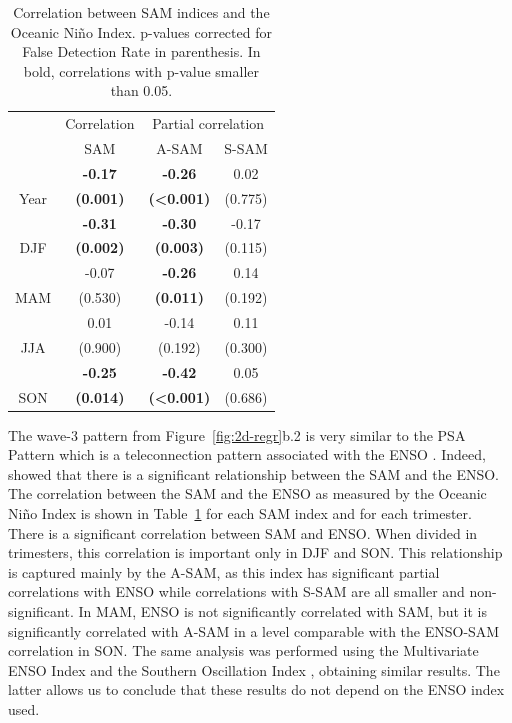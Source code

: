 \documentclass[smallextended]{svjour3}       %
\begin{document}
\begin{table}

\caption{\label{tab:enso-cor-table}Correlation between SAM indices and the Oceanic Niño Index. p-values corrected for False Detection Rate in parenthesis. In bold, correlations with p-value smaller than 0.05.}
\centering
\begin{tabular}[t]{c>{}c>{}c>{}c}
\toprule
\multicolumn{1}{c}{ } & \multicolumn{1}{c}{Correlation} & \multicolumn{2}{c}{Partial correlation} \\
\cmidrule(l{3pt}r{3pt}){2-2} \cmidrule(l{3pt}r{3pt}){3-4}
 & SAM & A-SAM & S-SAM\\
\midrule
 & \textbf{-0.17} & \textbf{-0.26} & 0.02\\
\cmidrule{2-4}
\multirow[t]{-2}{*}{\centering\arraybackslash Year} & \textbf{(0.001)} & \textbf{(<0.001)} & (0.775)\\
\cmidrule{1-4}
 & \textbf{-0.31} & \textbf{-0.30} & -0.17\\
\cmidrule{2-4}
\multirow[t]{-2}{*}{\centering\arraybackslash DJF} & \textbf{(0.002)} & \textbf{(0.003)} & (0.115)\\
\cmidrule{1-4}
 & -0.07 & \textbf{-0.26} & 0.14\\
\cmidrule{2-4}
\multirow[t]{-2}{*}{\centering\arraybackslash MAM} & (0.530) & \textbf{(0.011)} & (0.192)\\
\cmidrule{1-4}
 & 0.01 & -0.14 & 0.11\\
\cmidrule{2-4}
\multirow[t]{-2}{*}{\centering\arraybackslash JJA} & (0.900) & (0.192) & (0.300)\\
\cmidrule{1-4}
 & \textbf{-0.25} & \textbf{-0.42} & 0.05\\
\cmidrule{2-4}
\multirow[t]{-2}{*}{\centering\arraybackslash SON} & \textbf{(0.014)} & \textbf{(<0.001)} & (0.686)\\
\bottomrule
\end{tabular}
\end{table}

The wave-3 pattern from Figure~\ref{fig:2d-regr}b.2 is very similar to the PSA Pattern \citep{mo1987, kidson1988} which is a teleconnection pattern associated with the ENSO \citep{karoly1989}.
Indeed, \citet{fogt2011} showed that there is a significant relationship between the SAM and the ENSO.
The correlation between the SAM and the ENSO as measured by the Oceanic Niño Index \citep[ONI,][]{bamston1997} is shown in Table~\ref{tab:enso-cor-table} for each SAM index and for each trimester.
There is a significant correlation between SAM and ENSO. When divided in trimesters, this correlation is important only in DJF and SON.
This relationship is captured mainly by the A\nobreakdash-SAM, as this index has significant partial correlations with ENSO while correlations with S\nobreakdash-SAM are all smaller and non-significant.
In MAM, ENSO is not significantly correlated with SAM, but it is significantly correlated with A\nobreakdash-SAM in a level comparable with the ENSO-SAM correlation in SON. The same analysis was performed using the Multivariate ENSO Index \citep{wolter2011} and the Southern Oscillation Index \citep{ropelewski1987}, obtaining similar results.
The latter allows us to conclude that these results do not depend on the ENSO index used.
\end{document}
